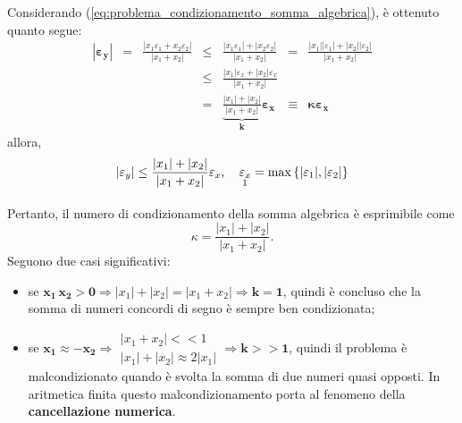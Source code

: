 Considerando (\ref{eq:problema_condizionamento_somma_algebrica}), è ottenuto quanto segue:
\begin{equation*}
	\begin{matrix}
		\boldsymbol{|\varepsilon_y|} &=&\frac{|x_1\varepsilon_1+x_2\varepsilon_2|}{|x_1+x_2|} &\leq& \frac{|x_1\varepsilon_1|+|x_2\varepsilon_2|}{|x_1+x_2|}&=& \frac{|x_1||\varepsilon_1|+|x_2||\varepsilon_2|}{|x_1+x_2|}\\
		&& &\leq& \frac{|x_1|\varepsilon_x+|x_2|\varepsilon_x}{|x_1+x_2|}\\
		&& &=& \underbrace{\frac{|x_1|+|x_2|}{|x_1+x_2|}}_{\boldsymbol k}\boldsymbol{\varepsilon_x} &\equiv& \boldsymbol{\kappa\varepsilon_x}
	\end{matrix}
\end{equation*}
allora,
\begin{equation*}
	|\varepsilon_y| \leq \frac{|x_1|+|x_2|}{|x_1+x_2|}\varepsilon_x, \quad \underset{\footnotemark}{\varepsilon_x}=\max\left\{|\varepsilon_1|,|\varepsilon_2|\right\}
\end{equation*}

Pertanto, il numero di condizionamento della somma algebrica è esprimibile come
\begin{equation*}
	\kappa=\frac{|x_1|+|x_2|}{|x_1+x_2|}.
\end{equation*}
Seguono due casi significativi:
\begin{itemize}
	\item se $\boldsymbol{x_1\, x_2>0}\Rightarrow|x_1|+|x_2|=|x_1+x_2|\Rightarrow \boldsymbol{k=1}$, quindi è concluso che la somma di numeri concordi di segno è sempre ben condizionata;
	\item se $\boldsymbol{x_1\approx -x_2}\Rightarrow\begin{matrix}
		|x_1+x_2| << 1\\
		|x_1|+|x_2| \approx 2|x_1|
	\end{matrix}\Rightarrow \boldsymbol{k>>1}$, quindi il problema è malcondizionato quando è svolta la somma di due numeri quasi opposti. In aritmetica finita questo malcondizionamento porta al fenomeno della \textbf{cancellazione numerica}.
\end{itemize}

